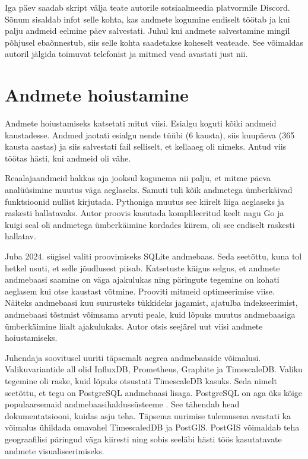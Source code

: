 Iga päev saadab skript välja teate autorile sotsiaalmeedia platvormile Discord. Sõnum sisaldab infot selle kohta, kas andmete kogumine endiselt töötab ja kui palju andmeid eelmine päev salvestati. Juhul kui andmete salvestamine mingil põhjusel ebaõnnestub, siis selle kohta saadetakse koheselt veateade. See võimaldas autoril jälgida toimuvat telefonist ja mitmed vead avastati just nii.
 
\section{Andmete hoiustamine}

Andmete hoiustamiseks katsetati mitut viisi. Esialgu koguti kõiki andmeid kaustadesse. Andmed jaotati esialgu nende tüübi (6 kausta), siis kuupäeva (365 kausta aastas) ja siis salvestati fail selliselt, et kellaaeg oli nimeks. Antud viis töötas hästi, kui andmeid oli vähe. 

Reaalajaandmeid hakkas aja jooksul kogunema nii palju, et mitme päeva analüüsimine muutus väga aeglaseks. Samuti tuli kõik andmetega ümberkäivad funktsioonid nullist kirjutada. Pythoniga muutus see kiirelt liiga aeglaseks ja raskesti hallatavaks. Autor proovis kasutada komplileeritud keelt nagu Go ja kuigi seal oli andmetega ümberkäimine kordades kiirem, oli see endiselt raskesti hallatav. 

Juba 2024. sügisel valiti proovimiseks SQLite andmebaas. Seda seetõttu, kuna tol hetkel usuti, et selle jõudlusest piisab. Katsetuste käigus selgus, et andmete andmebaasi saamine on väga ajakulukas ning päringute tegemine on kohati aeglasem kui otse kaustast võtmine. Prooviti mitmeid optimeerimise viise. Näiteks andmebaasi kuu suurusteks tükkideks jagamist, ajatulba indekseerimist, andmebaasi tõstmist võimsama arvuti peale, kuid lõpuks muutus andmebaasiga ümberkäimine liialt ajakulukaks. Autor otsis seejärel uut viisi andmete hoiustamiseks.

Juhendaja soovitusel uuriti täpsemalt aegrea andmebaaside võimalusi. Valikuvariantide all olid InfluxDB, Prometheus, Graphite ja TimescaleDB. Valiku tegemine oli raske, kuid lõpuks otsustati TimescaleDB kasuks. Seda nimelt seetõttu, et tegu on PostgreSQL andmebaasi lisaga. PostgreSQL on aga üks kõige populaarsemaid andmebaasihaldussüsteeme \cite{dbengines_ranking}. See tähendab head dokumentatsiooni, kuidas asju teha. Täpsema uurimise tulemusena avastati ka võimalus ühildada omavahel TimescaledDB ja PostGIS. PostGIS võimaldab teha geograafilisi päringud väga kiiresti ning sobis seeläbi hästi töös kasutatavate andmete visualiseerimiseks.


